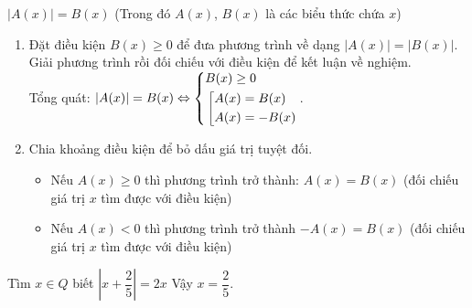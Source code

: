 \begin{dang}{$|A(x)|=B(x)$ (Trong đó $A(x)$, $B(x)$ là các biểu thức chứa $x$)}
	\begin{enumerate}[Cách 1.]
		\item  Đặt điều kiện $B(x)\geq 0$ để đưa phương trình về dạng $|A(x)|=|B(x)|$. Giải phương trình rồi đối chiếu với điều kiện để kết luận về nghiệm.\\
		Tổng quát: $|A(x)|=B(x)\Leftrightarrow \left\{\begin{aligned}&B(x)\geq 0\\&\left[\begin{aligned}&A(x)=B(x)\\&A(x)=-B(x)\end{aligned}\right.\end{aligned}\right.$.
		\item Chia khoảng điều kiện để bỏ dấu giá trị tuyệt đối.
		\begin{itemize}
			\item Nếu $A(x)\geq 0$ thì phương trình trở thành: $A(x) = B(x)$ (đối chiếu giá trị $x$ tìm được với điều kiện)
			\item Nếu $A (x)< 0$ thì phương trình trở thành $-A(x) = B(x)$ (đối chiếu giá trị $x$ tìm được với điều kiện)
		\end{itemize}
	\end{enumerate}
\end{dang}
\begin{vd}%
	Tìm $x \in Q$ biết $\left|x+\dfrac{2}{5}\right|=2x$
	Vậy $x=\dfrac{2}{5}$.
\end{vd}
